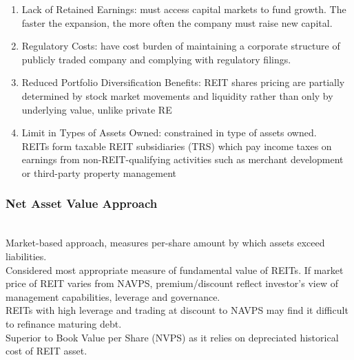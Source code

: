 \begin{remark} 
\begin{enumerate}[label=\roman*.]
\setlength{\itemsep}{0pt}
\item Lack of Retained Earnings: must access capital markets to fund growth. The faster the expansion, the more often the company must raise new capital.
\item Regulatory Costs: have cost burden of maintaining a corporate structure of publicly traded company and complying with regulatory filings.
\item Reduced Portfolio Diversification Benefits: REIT shares pricing are partially determined by stock market movements and liquidity rather than only by underlying value, unlike private RE
\item Limit in Types of Assets Owned: constrained in type of assets owned.\\
REITs form taxable REIT subsidiaries (TRS) which pay income taxes on earnings from non-REIT-qualifying activities such as merchant development or third-party property management 
\end{enumerate}
\end{remark}

\subsubsection{Net Asset Value Approach}

\begin{definition} \\
Market-based approach, measures per-share amount by which assets exceed liabilities.\\
Considered most appropriate measure of fundamental value of REITs. If market price of REIT varies from NAVPS, premium/discount reflect investor's view of management capabilities, leverage and governance.\\
REITs with high leverage and trading at discount to NAVPS may find it difficult to refinance maturing debt.\\
Superior to Book Value per Share (NVPS) as it relies on depreciated historical cost of REIT asset.
\end{definition}

